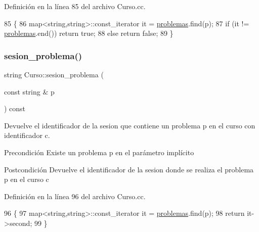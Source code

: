 Definición en la línea 85 del archivo Curso.\+cc.


\begin{DoxyCode}
85                                                        \{
86         map<string,string>::const\_iterator it = \mbox{\hyperlink{class_curso_a56b39dae4abfc058cf57956af639f1cb}{problemas}}.find(p);
87         \textcolor{keywordflow}{if} (it != \mbox{\hyperlink{class_curso_a56b39dae4abfc058cf57956af639f1cb}{problemas}}.end()) \textcolor{keywordflow}{return} \textcolor{keyword}{true};
88         \textcolor{keywordflow}{else} \textcolor{keywordflow}{return} \textcolor{keyword}{false};
89       \}
\end{DoxyCode}
\mbox{\label{class_curso_ac70e956fb7a0511e5fbdd097a689b69f}} 
\subsubsection{\texorpdfstring{sesion\+\_\+problema()}{sesion\_problema()}}
{\footnotesize\ttfamily string Curso\+::sesion\+\_\+problema (\begin{DoxyParamCaption}\item[{const string \&}]{p }\end{DoxyParamCaption}) const}



Devuelve el identificador de la sesion que contiene un problema p en el curso con identificador c. 

\begin{DoxyPrecond}{Precondición}
Existe un problema p en el parámetro implícito 
\end{DoxyPrecond}
\begin{DoxyPostcond}{Postcondición}
Devuelve el identificador de la sesion donde se realiza el problema p en el curso c 
\end{DoxyPostcond}


Definición en la línea 96 del archivo Curso.\+cc.


\begin{DoxyCode}
96                                                          \{
97         map<string,string>::const\_iterator it = \mbox{\hyperlink{class_curso_a56b39dae4abfc058cf57956af639f1cb}{problemas}}.find(p);
98         \textcolor{keywordflow}{return} it->second;
99       \} 
\end{DoxyCode}
\mbox{\label{class_curso_a35e0418ee2dba118a984c5f56d82c371}} 

